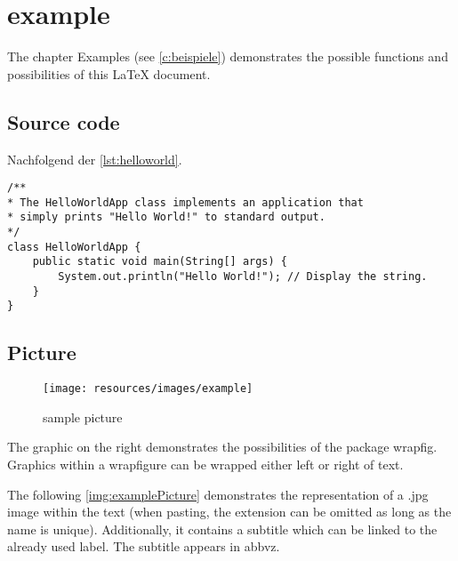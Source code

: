 \chapter{example} \label{c:beispiele}

The chapter Examples (see \autoref{c:beispiele}) demonstrates the possible functions and possibilities of this LaTeX document.


\section{Source code}

Nachfolgend der \autoref{lst:helloworld}.

\begin{lstlisting}[caption={Hello World}, captionpos=b, label={lst:helloworld}]
/**
* The HelloWorldApp class implements an application that
* simply prints "Hello World!" to standard output.
*/
class HelloWorldApp {
	public static void main(String[] args) {
		System.out.println("Hello World!"); // Display the string.
	}
}
\end{lstlisting}



\section{Picture}

\begin{wrapfigure}{R}{0.5\textwidth}
	\centering
	\texttt{[image: resources/images/example]}
	\caption{sample picture {\cite{PEXELS2015}}}
\end{wrapfigure}

The graphic on the right demonstrates the possibilities of the package \glqq wrapfig\grqq . Graphics within a \glqq wrapfigure\grqq{} can be wrapped either left or right of text.

The following \autoref{img:examplePicture} demonstrates the representation of a \glqq *.jpg\grqq{} image within the text (when pasting, the extension can be omitted as long as the name is unique). Additionally, it contains a subtitle which can be linked to the already used label. The subtitle appears in \gls{abbvz}.


